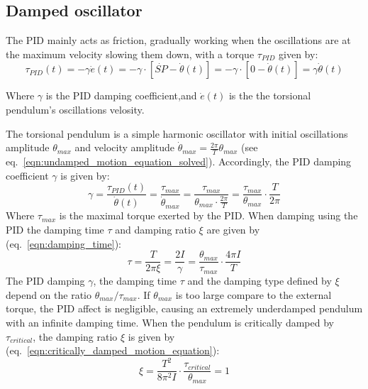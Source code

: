 \documentclass[\main/master.tex]{subfiles}
\begin{document}
\subsection{Damped oscillator}
The PID mainly acts as friction, gradually working when the oscillations are at the maximum velocity slowing them down, with a torque $\tau_{PID}$ given by:
\begin{equation}
\tau_{PID}(t) = -\gamma\dot{e}(t) =  -\gamma\cdot [\dot{SP} -\dot{\theta}(t)] =-\gamma\cdot [0-\dot{\theta}(t)]  =  \gamma\dot{\theta}(t)  
\label{eqn:friction_torque_pid}
\end{equation}
\par\noindent
Where $\gamma$ is the PID damping coefficient,and $\dot{e}(t)$ is the the torsional pendulum's oscillations velosity. 
\par\noindent
The torsional pendulum is a simple harmonic oscillator with initial oscillations amplitude $\theta_{max}$ and velocity amplitude $\dot{\theta}_{max} =\frac{2\pi}{T} \theta_{max}$ (see eq.~\ref{eqn:undamped_motion_equation_solved}). Accordingly, the PID damping coefficient $\gamma$ is given by:
\begin{equation}
\gamma  =  \frac{\tau_{PID}(t)}{\dot{\theta}(t)} = \frac{\tau_{max}}{\dot{\theta}_{max}} =  \frac{\tau_{max}}{\theta_{max}\cdot\frac{2\pi}{T}} =\frac{\tau_{max}}{\theta_{max}}\cdot \frac{ T}{2\pi}          \label{eqn:damped_pid_motion_equation_2}
\end{equation}
Where $\tau_{max}$ is the maximal torque exerted by the PID. When damping using the PID the damping time $\tau$ and damping ratio $\xi$ are given by (eq.~\ref{eqn:damping_time}):
\begin{equation}
\tau = \frac{T}{2 \pi \xi } =  \frac{2I}{\gamma} = \frac{\theta_{max}}{ \tau_{max}} \cdot \frac{4\pi I}{T}  \label{eqn:damping_time_pid}
\end{equation}
The PID damping $\gamma$, the damping time $\tau$ and the damping type defined by $\xi$ depend on the ratio $\theta_{max}/\tau_{max}$. If $\theta_{max}$ is too large compare to the external torque, the PID affect is negligible, causing an extremely underdamped pendulum with an infinite damping time. When the pendulum is critically damped  by $\tau_{critical}$, the damping ratio $\xi$ is given by (eq.~\ref{eqn:critically_damped_motion_equation}):
\begin{equation}
\xi = \frac{T^2}{ 8 \pi^2 I }\cdot\frac{ \tau_{critical}}{\theta_{max}} = 1 
\label{eqn:damping_ratio_pid}
\end{equation}
\end{document}
